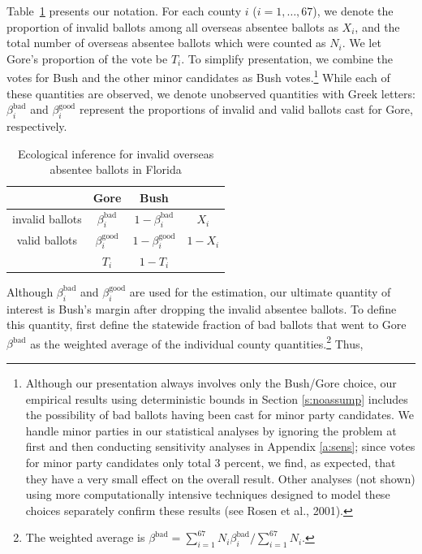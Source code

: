 \documentclass[11pt,titlepage]{article}
\newcommand{\bb}{\beta^{\text{bad}}}
\newcommand{\bg}{\beta^{\text{good}}}
\begin{document}
Table~\ref{tb:ei} presents our notation.  For each county $i$
($i=1,\dots,67$), we denote the proportion of invalid ballots among
all overseas absentee ballots as $X_i$, and the total number of
overseas absentee ballots which were counted as $N_i$.  We let Gore's
proportion of the vote be $T_i$.  To simplify presentation, we combine
the votes for Bush and the other minor candidates as Bush
votes.\footnote{Although our presentation always involves only the
  Bush/Gore choice, our empirical results using deterministic bounds
  in Section \ref{s:noassump} includes the possibility of bad ballots
  having been cast for minor party candidates.  We handle minor
  parties in our statistical analyses by ignoring the problem at first
  and then conducting sensitivity analyses in Appendix \ref{a:sens};
  since votes for minor party candidates only total 3 percent, we
  find, as expected, that they have a very small effect on the overall
  result.  Other analyses (not shown) using more computationally
  intensive techniques designed to model these choices separately
  confirm these results (see Rosen et al., 2001)\nocite{RosJaiKin01}.}
While each of these quantities are observed, we denote unobserved
quantities with Greek letters: $\bb_i$ and $\bg_i$ represent the
proportions of invalid and valid ballots cast for Gore, respectively.
\begin{table}[t]
\begin{center}
\begin{tabular}{cccc}
                & Gore  & Bush &         \\
\hline 
invalid ballots & $\bb_i$  & $1-\bb_i$ & $X_i$   \\
valid ballots   & $\bg_i$  & $1-\bg_i$ & $1-X_i$ \\
\hline
                & $T_i$ & $1-T_i$ &         \\
\end{tabular} \caption{Ecological inference for invalid overseas
  absentee ballots in Florida}\label{tb:ei}
\end{center}
\end{table} 

Although $\bb_i$ and $\bg_i$ are used for the estimation, our ultimate
quantity of interest is Bush's margin after dropping the invalid
absentee ballots.  To define this quantity, first define the statewide
fraction of bad ballots that went to Gore $\bb$ as the weighted
average of the individual county quantities.\footnote{The weighted
  average is $\bb=\sum_{i=1}^{67}N_i\bb_i/\sum_{i=1}^{67}N_i$.}  Thus,
\end{document}
